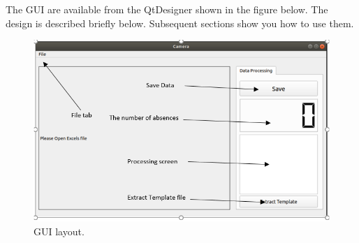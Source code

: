 \documentclass[journal, twocolumn]{IEEEtran}
\begin{document}
The GUI are available from the QtDesigner shown in the figure below. The design is described briefly below. Subsequent sections show you how to use them.

\begin{figure}[!h]
	\centering
	\includegraphics[width=0.8\linewidth]{img/user_guide.png}
	\caption{GUI layout.}\label{fig:user_guide}
\end{figure}
\end{document}

